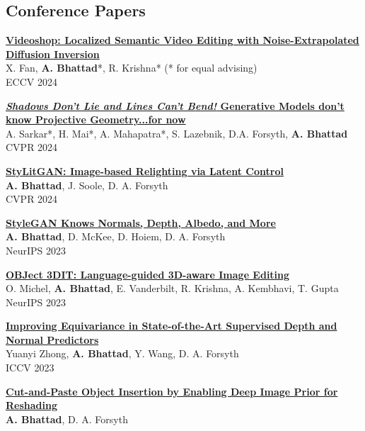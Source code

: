 \documentclass[margin,line]{res}
\begin{document}
\begin{resume}
\section{\sc \large Conference Papers}
\renewcommand*{\labelenumi}{\theenumi.}
\begin{etaremune}[start=11, leftmargin=15pt]
\item {\bf \href{https://arxiv.org/abs/2403.14617}{Videoshop: Localized Semantic Video Editing with Noise-Extrapolated Diffusion Inversion
}} \\{X. Fan, {\bf A. Bhattad}*, R. Krishna*} \hfill{(* for equal advising)} \\
ECCV 2024
\item {\bf \href{https://arxiv.org/abs/2311.17138}{\textit{Shadows Don't Lie and Lines Can't Bend!} Generative Models don't know Projective Geometry...for now}} \\{A. Sarkar*, H. Mai*, A. Mahapatra*, S. Lazebnik, D.A. Forsyth, {\bf A. Bhattad}} \\
CVPR 2024
\item {\bf \href{https://openaccess.thecvf.com/content/CVPR2024/papers/Bhattad_StyLitGAN_Image-Based_Relighting_via_Latent_Control_CVPR_2024_paper.pdf}{StyLitGAN: Image-based Relighting via Latent Control}} \\{{\bf A. Bhattad}, J. Soole, D. A. Forsyth} \\
CVPR 2024
\item {\bf \href{https://arxiv.org/abs/2306.00987}{StyleGAN Knows Normals, Depth, Albedo, and More}} \\{{\bf A. Bhattad}, {D. McKee}, D. Hoiem, D. A. Forsyth}\\
NeurIPS 2023
\item {\bf \href{https://arxiv.org/abs/2307.11073}{OBJect 3DIT: Language-guided 3D-aware Image Editing
}} \\{O. Michel, {\bf A. Bhattad}, E. Vanderbilt, R. Krishna, A. Kembhavi, T. Gupta
}\\
NeurIPS 2023
\item {\bf \href{https://arxiv.org/abs/2309.16646v2}{Improving Equivariance in State-of-the-Art Supervised Depth and Normal Predictors}} \\{Yuanyi Zhong, {\bf A. Bhattad}, Y. Wang, D. A. Forsyth}\\
ICCV 2023
\item {\bf \href{https://anandbhattad.github.io/projects/dipr.pdf}{Cut-and-Paste Object Insertion by Enabling Deep Image Prior for Reshading }} \\{{\bf A. Bhattad}, D. A. Forsyth}

\end{etaremune}
\end{resume}
\end{document}
